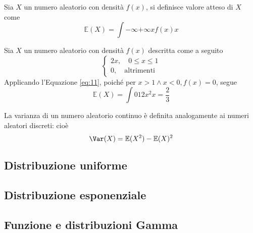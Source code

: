 \documentclass{subfiles}
\begin{document}
\begin{Definition*}
    Sia \(X\) un numero aleatorio con densità \(f(x)\), si definisce valore atteso di \(X\) come
    \begin{equation}
        \mathbb{E}(X) = \int{-\infty}{+\infty}{x f(x)}{x}
    \end{equation}
\end{Definition*}
\begin{Example*}
    Sia \(X\) un numero aleatorio con densità \(f(x)\) descritta come a seguito
    \[\begin{cases}
            2x,  \quad 0 \le x \le 1 \\
            0, \quad \text{altrimenti}
        \end{cases}\]
    Applicando l'Equazione \eqref{eq:11},  poiché per \(x > 1 \land x < 0, f(x) = 0\), segue
    \[
        \mathbb{E}(X) = \int{0}{1}{2x^{2}}{x} = \frac{2}{3}
    \]

    \noindent
    La varianza di un numero aleatorio continuo è definita analogamente ai numeri aleatori discreti: cioè
    \[
        \Var(X) = \mathbb{E}(X^{2}) - \mathbb{E}(X)^{2}
    \]
\end{Example*}

\subsection{Distribuzione uniforme}


\subsection{Distribuzione esponenziale}


\subsection{Funzione e distribuzioni Gamma}

\end{document}
